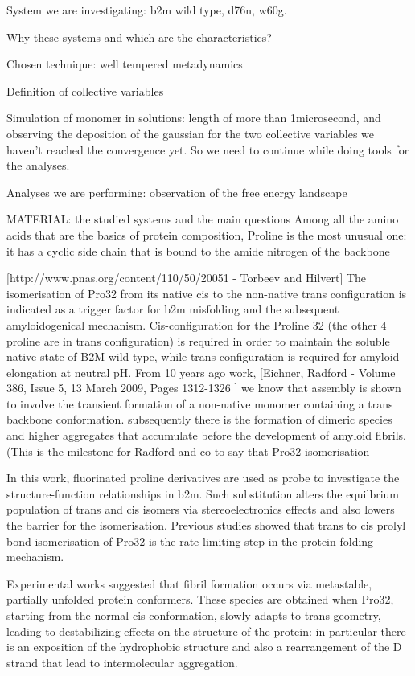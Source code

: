System we are investigating: b2m wild type, d76n, w60g.

Why these systems and which are the characteristics?

Chosen technique: well tempered metadynamics

Definition of collective variables

Simulation of monomer in solutions: length of more than 1microsecond, and observing the deposition of the gaussian for the two collective variables we haven't reached the convergence yet. So we need to continue while doing tools for the analyses.

Analyses we are performing:
observation of the free energy landscape 


MATERIAL: the studied systems and the main questions
Among all the amino acids that are the basics of protein composition, Proline is the most unusual one: it has a cyclic side chain that is bound to the amide nitrogen of the backbone  

[http://www.pnas.org/content/110/50/20051 - Torbeev and Hilvert]
The isomerisation of Pro32 from its native cis to the non-native trans configuration is indicated as a trigger factor for b2m misfolding and the subsequent amyloidogenical mechanism.
Cis-configuration for the Proline 32 (the other 4 proline are in trans configuration) is required in order to maintain the soluble native state of B2M wild type, while trans-configuration is required for amyloid elongation at neutral pH. From 10 years ago work, [Eichner, Radford - Volume 386, Issue 5, 13 March 2009, Pages 1312-1326 ] we know that assembly is shown to involve the transient formation of a non-native monomer containing a trans backbone conformation. subsequently there is the formation of dimeric species and higher aggregates that accumulate before the development of amyloid fibrils. (This is the milestone for Radford and co to say that Pro32 isomerisation

In this work, fluorinated proline derivatives are used as probe to investigate the structure-function relationships in b2m. Such substitution alters the equilbrium population of trans and cis isomers via stereoelectronics effects and also lowers the barrier for the isomerisation.
Previous studies showed that trans to cis prolyl bond isomerisation of Pro32 is the rate-limiting step in the protein folding mechanism.

Experimental works suggested that fibril formation occurs via metastable, partially unfolded protein conformers. These species are obtained when Pro32, starting from the normal cis-conformation, slowly adapts to trans geometry, leading to destabilizing effects on the structure of the protein: in particular there is an exposition of the hydrophobic structure and also a rearrangement of the D strand that lead to intermolecular aggregation. 